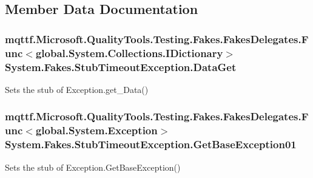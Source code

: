\subsection{Member Data Documentation}
\hypertarget{class_system_1_1_fakes_1_1_stub_timeout_exception_a1997affb93961b1472c6eed72aea63d2}{
\subsubsection[{Data\-Get}]{\setlength{\rightskip}{0pt plus 5cm}mqttf.\-Microsoft.\-Quality\-Tools.\-Testing.\-Fakes.\-Fakes\-Delegates.\-Func$<$global.\-System.\-Collections.\-I\-Dictionary$>$ System.\-Fakes.\-Stub\-Timeout\-Exception.\-Data\-Get}}\label{class_system_1_1_fakes_1_1_stub_timeout_exception_a1997affb93961b1472c6eed72aea63d2}


Sets the stub of Exception.\-get\-\_\-\-Data()

\hypertarget{class_system_1_1_fakes_1_1_stub_timeout_exception_a6a69ea307c16e7c7435e637df2232a14}{
\subsubsection[{Get\-Base\-Exception01}]{\setlength{\rightskip}{0pt plus 5cm}mqttf.\-Microsoft.\-Quality\-Tools.\-Testing.\-Fakes.\-Fakes\-Delegates.\-Func$<$global.\-System.\-Exception$>$ System.\-Fakes.\-Stub\-Timeout\-Exception.\-Get\-Base\-Exception01}}\label{class_system_1_1_fakes_1_1_stub_timeout_exception_a6a69ea307c16e7c7435e637df2232a14}


Sets the stub of Exception.\-Get\-Base\-Exception()

